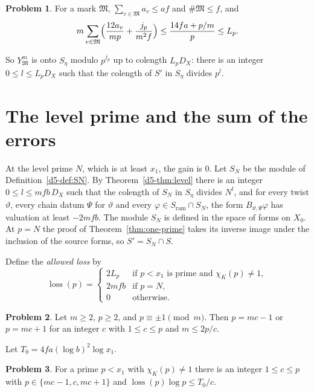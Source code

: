 \documentclass[reqno]{amsart}
\theoremstyle{definition}
\newtheorem{problem}{Problem}[section]
\theoremstyle{plain}
\theoremstyle{definition}
\theoremstyle{remark}
\newcommand{\loss}{\operatorname{loss}}
\newcommand{\ram}{\mathrm{ram}}
\newcommand{\Mk}{\mathfrak M}
\begin{document}
\begin{problem}\label{pr:budget}
For a mark \(\Mk\), \(\sum_{v \in \Mk} a_v \le af\) and \(\#\Mk \le f\), and
\[
  m \sum_{v \in \Mk} \Bigl(\frac{12 a_v}{mp} + \frac{j_p}{m^2 f}\Bigr) \le \frac{14fa + p/m}{p} \le L_p .
\]
\end{problem}

So \(Y_{\Mk}^m\) is onto \(S_\eta\) modulo \(p^{j_p}\) up to colength \(L_p D_X\): there is an integer \(0 \le l \le L_p D_X\) such that the colength of \(S'\) in \(S_\eta\) divides \(p^l\).

\section{The level prime and the sum of the errors}\label{sec:sum}

At the level prime \(N\), which is at least \(x_1\), the gain is \(0\).  Let \(S_N\) be the module of Definition~\ref{d5-def:SN}.  By Theorem~\ref{d5-thm:level} there is an integer \(0 \le l \le mfb\, D_X\) such that the colength of \(S_N\) in \(S_\eta\) divides \(N^l\), and for every twist \(\vartheta\), every chain datum \(\Psi\) for \(\vartheta\) and every \(\varphi \in S_\ram \cap S_N\), the form \(B_{\vartheta,\Psi}\varphi\) has valuation at least \(-2mfb\).  The module \(S_N\) is defined in the space of forms on \(X_0\).  At \(p=N\) the proof of Theorem~\ref{thm:one-prime} takes its inverse image under the inclusion of the source forms, so \(S'=S_N\cap S\).

Define the \emph{allowed loss} by
\[
  \loss(p) = \begin{cases} 2L_p & \text{if } p < x_1 \text{ is prime and } \chi_K(p) \ne 1,\\ 2mfb & \text{if } p = N,\\ 0 & \text{otherwise.} \end{cases}
\]

\begin{problem}\label{pr:pm-one}
Let \(m \ge 2\), \(p \ge 2\), and \(p \equiv \pm 1 \pmod m\).  Then \(p = mc - 1\) or \(p = mc + 1\) for an integer \(c\) with \(1 \le c \le p\) and \(m \le 2p/c\).
\end{problem}

Let \(T_0 = 4fa(\log b)^2\log x_1\).

\begin{problem}\label{pr:term}
For a prime \(p < x_1\) with \(\chi_K(p) \ne 1\) there is an integer \(1 \le c \le p\) with \(p \in \{mc - 1, c, mc + 1\}\) and \(\loss(p)\log p \le T_0/c\).
\end{problem}
\end{document}
